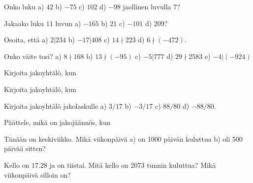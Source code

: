 

\begin{kotitehtavasivu}

\begin{tehtava}
	Onko luku a) $42$ b) $-75$ c) $102$ d) $-98$ jaollinen luvulla $7$?
\end{tehtava}

\begin{tehtava}
	Jakaako luku $11$ luvun a) $-165$ b) $21$ c) $-101$ d) $209$?
\end{tehtava}

\begin{tehtava}
	Osoita, että a) $2|234$ b) $-17|408$ c) $14 \nmid 223$ d) $6 \nmid (-472)$.
\end{tehtava}

\begin{tehtava}
	Onko väite tosi? a) $8 \nmid 168$ b) $13 \nmid (-95)$ c) $-5|777$ d) $29\nmid 2583$ e) $-4|(-924)$
\end{tehtava}

\begin{tehtava}
	Kirjoita jakoyhtälö, kun
\end{tehtava}

\begin{tehtava}
	Kirjoita jakoyhtälö, kun
\end{tehtava}

\begin{tehtava}
	Kirjoita jakoyhtälö jakolaskulle a) $3/17$ b) $-3/17$ c) $88/80$ d) $-88/80$.
\end{tehtava}

\begin{tehtava}
	Päättele, mikä on jakojäännös, kun
\end{tehtava}

\begin{tehtava}
	Tänään on keskiviikko. Mikä viikonpäivä a) on 1000 päivän kuluttua b) oli 500 päivää sitten?
\end{tehtava}

\begin{tehtava}
	Kello on $17.28$ ja on tiistai. Mitä kello on 2073 tunnin kuluttua? Mikä viikonpäivä silloin on?
\end{tehtava}


\end{kotitehtavasivu}
